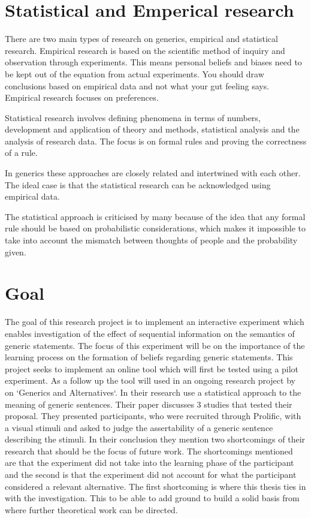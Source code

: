 \documentclass[twoside]{uva-inf-bachelor-thesis}
\theoremstyle{definition}
\begin{document}
\section{Statistical and Emperical research}
There are two main types of research on generics, empirical and statistical research. Empirical research is based on the scientific method of inquiry and observation through experiments. This means personal beliefs and biases need to be kept out of the equation from actual experiments. You should draw conclusions based on empirical data and not what your gut feeling says. Empirical research focuses on preferences.

Statistical research involves defining phenomena in terms of numbers, development and application of theory and methods, statistical analysis and the analysis of research data. The focus is on formal rules and proving the correctness of a rule.

In generics these approaches are closely related and intertwined with each other. The ideal case is that the statistical research can be acknowledged using empirical data. 

The statistical approach is criticised by many because of the idea that any formal rule should be based on probabilistic considerations, which makes it impossible to take into account the mismatch between thoughts of people and the probability given.

\section{Goal}
The goal of this research project is to implement an interactive experiment which enables investigation of the effect of sequential information on the semantics of generic statements. The focus of this experiment will be on the importance of the learning process on the formation of beliefs regarding generic statements. This project seeks to implement an online tool which will first be tested using a pilot experiment. As a follow up the tool will used in an ongoing research project by \cite{RooijSchulzGenAlt} on `Generics and Alternatives`. In their research \cite{RooijSchulzGenAlt} use a statistical approach to the meaning of generic sentences. Their paper discusses 3 studies that tested their proposal. They presented participants, who were recruited through Prolific, with a visual stimuli and asked to judge the assertability of a generic sentence describing the stimuli.  In their conclusion they mention two shortcomings of their research that should be the focus of future work. The shortcomings mentioned are that the experiment did not take into the learning phase of the participant and the second is that the experiment did not account for what the participant considered a relevant alternative. The first shortcoming is where this thesis ties in with the investigation. This to be able to add ground to build a solid basis from where further theoretical work can be directed.
\end{document}
